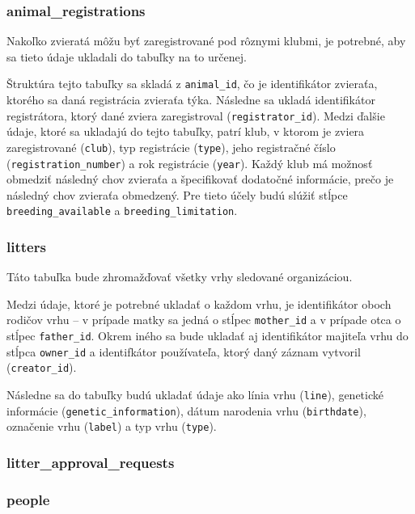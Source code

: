\subsubsection*{animal\_registrations}
Nakoľko zvieratá môžu byť zaregistrované pod rôznymi klubmi, je potrebné, aby sa tieto údaje ukladali do tabuľky na to určenej.

Štruktúra tejto tabuľky sa skladá z \texttt{animal_id}, čo je identifikátor zvieraťa, ktorého sa daná registrácia zvieraťa týka. Následne sa ukladá identifikátor registrátora, ktorý dané zviera zaregistroval (\texttt{registrator_id}). Medzi ďalšie údaje, ktoré sa ukladajú do tejto tabuľky, patrí klub, v ktorom je zviera zaregistrované (\texttt{club}), typ registrácie (\texttt{type}), jeho registračné číslo (\texttt{registration_number}) a rok registrácie (\texttt{year}). 
Každý klub má možnosť obmedziť následný chov zvieraťa a špecifikovať dodatočné informácie, prečo je následný chov zvieraťa obmedzený. Pre tieto účely budú slúžiť stĺpce \texttt{breeding_available} a \texttt{breeding_limitation}.

\subsubsection*{litters}
Táto tabuľka bude zhromažďovať všetky vrhy sledované organizáciou.

Medzi údaje, ktoré je potrebné ukladať o každom vrhu, je identifikátor oboch rodičov vrhu -- v prípade matky sa jedná o stĺpec \texttt{mother_id} a v prípade otca o stĺpec \texttt{father_id}. Okrem iného sa bude ukladať aj identifikátor majiteľa vrhu do stĺpca \texttt{owner_id} a identifkátor používateľa, ktorý daný záznam vytvoril (\texttt{creator_id}).

Následne sa do tabuľky budú ukladať údaje ako línia vrhu (\texttt{line}), genetické informácie (\texttt{genetic_information}), dátum narodenia vrhu (\texttt{birthdate}), označenie vrhu (\texttt{label}) a typ vrhu (\texttt{type}).

\subsubsection*{litter\_approval\_requests}

\subsubsection*{people}

